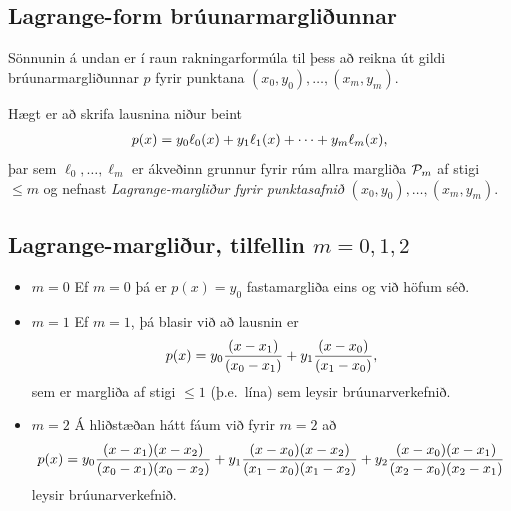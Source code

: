 \documentclass[letterpaper,10pt,icelandic]{sphinxmanual}
\begin{document}

\subsection{Lagrange-form brúunarmargliðunnar}
\label{kafli03:index-7}\label{kafli03:lagrange-form-bruunarmargliunnar}
Sönnunin á undan er í raun rakningarformúla til þess að reikna út gildi
brúunarmargliðunnar \(p\) fyrir punktana
\((x_0,y_0),\dots,(x_m,y_m)\).

Hægt er að skrifa lausnina niður beint
\begin{gather}
\begin{split}p(x)=y_0\ell_0(x)+y_1\ell_1(x)+\cdots+y_m\ell_m(x),\end{split}\notag
\end{gather}
þar sem \(\ell_0,\dots,\ell_m\) er ákveðinn grunnur fyrir rúm allra
margliða \({\cal P}_m\) af stigi \(\leq m\) og nefnast
\emph{Lagrange-margliður fyrir punktasafnið}
\((x_0,y_0),\dots,(x_m,y_m)\).


\subsection{Lagrange-margliður, tilfellin \(m=0,1,2\)}
\label{kafli03:lagrange-margliur-tilfellin}\begin{itemize}
\item {} 
\(m=0\) Ef \(m = 0\) þá er \(p(x) = y_0\) fastamargliða
eins og við höfum séð.

\item {} 
\(m=1\) Ef \(m = 1\), þá blasir við að lausnin er
\begin{gather}
\begin{split}p(x) = y_0 \frac{(x-x_1)}{(x_0-x_1)}
  + y_1 \frac{(x-x_0)}{(x_1-x_0)},\end{split}\notag
\end{gather}
sem er margliða af stigi \(\leq 1\) (þ.e. lína) sem leysir
brúunarverkefnið.

\item {} 
\(m=2\) Á hliðstæðan hátt fáum við fyrir \(m = 2\) að
\begin{gather}
\begin{split}p(x) = y_0 \frac{(x-x_1)(x-x_2)}{(x_0-x_1)(x_0-x_2)}
  + y_1 \frac{(x-x_0)(x-x_2)}{(x_1-x_0)(x_1-x_2)}
  + y_2 \frac{(x-x_0)(x-x_1)}{(x_2-x_0)(x_2-x_1)}\end{split}\notag
\end{gather}
leysir brúunarverkefnið.

\end{itemize}
\end{document}
